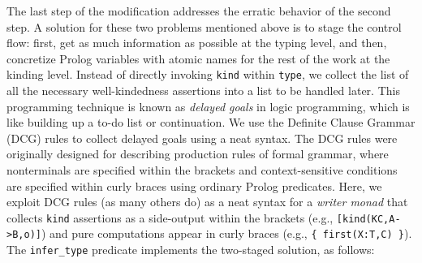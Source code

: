 \documentclass[runningheads,a4paper]{llncs}
\begin{document}
The last step of the modification addresses the erratic behavior of
the second step. A solution for these two problems mentioned above is
to stage the control flow: first, get as much information as possible
at the typing level, and then, concretize Prolog variables with atomic names
for the rest of the work at the kinding level. Instead of directly invoking
\verb|kind| within \verb|type|, we collect the list of all the necessary
well-kindedness assertions into a list to be handled later.
This programming technique is known as \emph{delayed goals}
in logic programming, which is like building up a to-do list or continuation.
We use the Definite Clause Grammar (DCG) rules %
to collect delayed goals using a neat syntax. The DCG rules were originally
designed for describing production rules of formal grammar, where nonterminals
are specified within the brackets and context-sensitive conditions are
specified within curly braces using ordinary Prolog predicates. Here,
we exploit DCG rules (as many others do) as a neat syntax for
a \emph{writer monad} that collects \texttt{kind} assertions
as a side-output within the brackets (e.g., \verb|[kind(KC,A->B,o)]|) and pure
computations appear in curly braces (e.g., \verb|{ first(X:T,C) }|).
The \verb|infer_type| predicate implements the two-staged solution,
as follows:\vspace{-.5ex}
\end{document}
